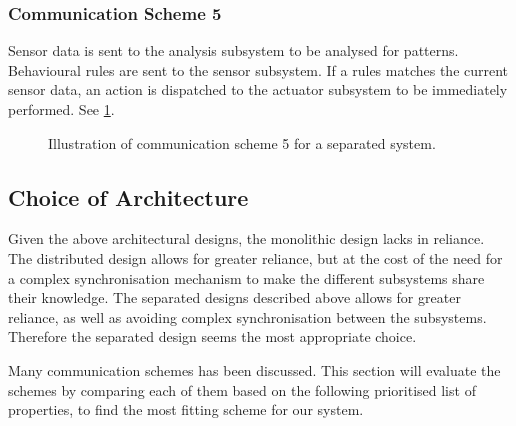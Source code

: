 \subsubsection{Communication Scheme 5}

Sensor data is sent to the analysis subsystem to be analysed for patterns. Behavioural rules are sent to the sensor subsystem. If a rules matches the current sensor data, an action is dispatched to the actuator subsystem to be immediately performed. See \cref{fig:separated_subsystems_scheme5}.

\begin{figure}[htbp]
\centering
{}
\caption[Communication scheme 5]{Illustration of communication scheme 5 for a separated system.}\label{fig:separated_subsystems_scheme5}
\end{figure}

\subsection{Choice of Architecture}

Given the above architectural designs, the monolithic design lacks in reliance. The distributed design allows for greater reliance, but at the cost of the need for a complex synchronisation mechanism to make the different subsystems share their knowledge. The separated designs described above allows for greater reliance, as well as avoiding complex synchronisation between the subsystems. Therefore the separated design seems the most appropriate choice.

Many communication schemes has been discussed. This section will evaluate the schemes by comparing each of them based on the following prioritised list of properties, to find the most fitting scheme for our system.

